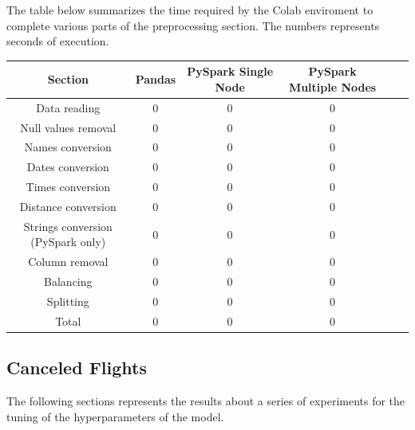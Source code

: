 \documentclass[
	letterpaper, %
	10pt, %
]{class}
\begin{document}
The table below summarizes the time required by the Colab enviroment to complete various parts of the preprocessing section.
The numbers represents seconds of execution.

\begin{center}
  \begin{tabular}{ |c|c|c|c|c|c| }
    \hline
    Section                           & Pandas & PySpark Single Node & PySpark Multiple Nodes \\
    \hline
    Data reading                      & 0      & 0                   & 0                      \\
    Null values removal               & 0      & 0                   & 0                      \\
    Names conversion                  & 0      & 0                   & 0                      \\
    Dates conversion                  & 0      & 0                   & 0                      \\
    Times conversion                  & 0      & 0                   & 0                      \\
    Distance conversion               & 0      & 0                   & 0                      \\
    Strings conversion (PySpark only) & 0      & 0                   & 0                      \\
    Column removal                    & 0      & 0                   & 0                      \\
    Balancing                         & 0      & 0                   & 0                      \\
    Splitting                         & 0      & 0                   & 0                      \\
    Total                             & 0      & 0                   & 0                      \\

    \hline
  \end{tabular}
\end{center}


\subsection{Canceled Flights}

The following sections represents the results about a series of experiments for the tuning of the hyperparameters of the model.
\end{document}

